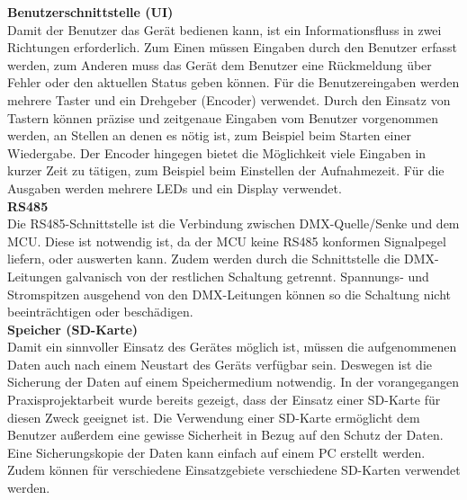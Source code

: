 \textbf{Benutzerschnittstelle (UI)}\\
Damit der Benutzer das Gerät bedienen kann, ist ein Informationsfluss in zwei Richtungen erforderlich. Zum Einen müssen Eingaben durch den Benutzer erfasst werden, zum Anderen muss das Gerät dem Benutzer eine Rückmeldung über Fehler oder den aktuellen Status geben können. Für die Benutzereingaben werden mehrere Taster und ein Drehgeber (Encoder) verwendet. Durch den Einsatz von Tastern können präzise und zeitgenaue Eingaben vom Benutzer vorgenommen werden, an Stellen an denen es nötig ist, zum Beispiel beim Starten einer Wiedergabe. Der Encoder hingegen bietet die Möglichkeit viele Eingaben in kurzer Zeit zu tätigen, zum Beispiel beim Einstellen der Aufnahmezeit. Für die Ausgaben werden mehrere LEDs und ein Display verwendet.\\
\newline
\textbf{RS485}\\
Die RS485-Schnittstelle ist die Verbindung zwischen DMX-Quelle/Senke und dem MCU. Diese ist notwendig ist, da der MCU keine RS485 konformen Signalpegel liefern, oder auswerten kann. Zudem werden durch die Schnittstelle die DMX-Leitungen galvanisch von der restlichen Schaltung getrennt. Spannungs- und Stromspitzen ausgehend von den DMX-Leitungen können so die Schaltung nicht beeinträchtigen oder beschädigen.\\
\newline
\textbf{Speicher (SD-Karte)}\\
Damit ein sinnvoller Einsatz des Gerätes möglich ist, müssen die aufgenommenen Daten auch nach einem Neustart des Geräts verfügbar sein. Deswegen ist die Sicherung der Daten auf einem Speichermedium notwendig. In der vorangegangen Praxisprojektarbeit wurde bereits gezeigt, dass der Einsatz einer SD-Karte für diesen Zweck geeignet ist. Die Verwendung einer SD-Karte ermöglicht dem Benutzer außerdem eine gewisse Sicherheit in Bezug auf den Schutz der Daten. Eine Sicherungskopie der Daten kann einfach auf einem PC erstellt werden. Zudem können für verschiedene Einsatzgebiete verschiedene SD-Karten verwendet werden.